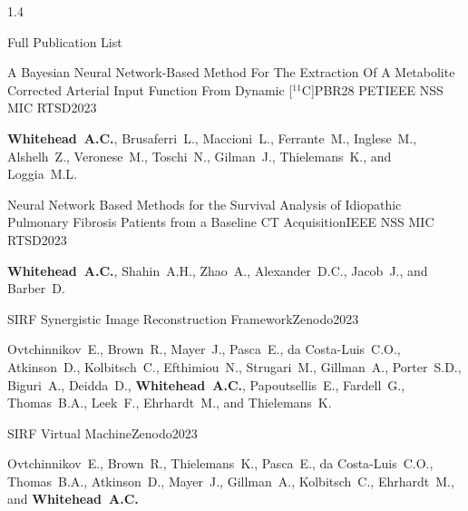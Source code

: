\documentclass{cv}
\begin{document}
\begin{spacing}{1.4}
\begin{rSection}{Full Publication List}
            \vspace{-0.5cm}
            \item \begin{rSubsection}{A Bayesian Neural Network-Based Method For The Extraction Of A Metabolite Corrected Arterial Input Function From Dynamic [$^{11}$C]PBR28 PET}{}{IEEE NSS MIC RTSD}{2023}
                \vspace{-0.25cm}
                \item \textbf{Whitehead~A.C.}, Brusaferri~L., Maccioni~L., Ferrante~M., Inglese~M., Alshelh~Z., Veronese~M., Toschi~N., Gilman~J., Thielemans~K., and Loggia~M.L.
            \end{rSubsection}
    
            \vspace{-0.5cm}
            \item \begin{rSubsection}{Neural Network Based Methods for the Survival Analysis of Idiopathic Pulmonary Fibrosis Patients from a Baseline CT Acquisition}{}{IEEE NSS MIC RTSD}{2023}
                \vspace{-0.25cm}
                \item \textbf{Whitehead~A.C.}, Shahin~A.H., Zhao~A., Alexander~D.C., Jacob~J., and Barber~D.
            \end{rSubsection}
    
            \vspace{-0.5cm}
            \item \begin{rSubsection}{SIRF Synergistic Image Reconstruction Framework}{}{Zenodo}{2023}
                \vspace{-0.25cm}
                \item Ovtchinnikov~E., Brown~R., Mayer~J., Pasca~E., da Costa-Luis~C.O., Atkinson~D., Kolbitsch~C., Efthimiou~N., Strugari~M., Gillman~A., Porter~S.D., Biguri~A., Deidda~D., \textbf{Whitehead~A.C.}, Papoutsellis~E., Fardell~G., Thomas~B.A., Leek~F., Ehrhardt~M., and Thielemans~K.
            \end{rSubsection}
    
            \vspace{-0.5cm}
                \item \begin{rSubsection}{SIRF Virtual Machine}{}{Zenodo}{2023}
                    \vspace{-0.25cm}
                    \item Ovtchinnikov~E., Brown~R., Thielemans~K., Pasca~E., da Costa-Luis~C.O., Thomas~B.A., Atkinson~D., Mayer~J., Gillman~A., Kolbitsch~C., Ehrhardt~M., and \textbf{Whitehead~A.C.}
                \end{rSubsection}
    

\end{rSection}
\end{spacing}
\end{document}
